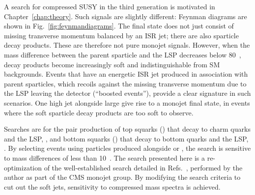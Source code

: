 A search for compressed \ac{SUSY} in the third generation is motivated in Chapter~\ref{chap:theory}.
Such signals are slightly different: Feynman diagrams are shown in Fig.~\ref{fig:feynmandiagrams}. 
The final state does not just consist of missing transverse momentum balanced by an ISR jet; 
there are also sparticle decay products.
These are therefore not pure monojet signals.
However, when the mass difference between the parent sparticle and the \ac{LSP} decreases below 80~\GeV, decay products become increasingly soft
and indistinguishable from \ac{SM} backgrounds.
Events that have an energetic \ac{ISR} jet produced in association with parent sparticles, which recoils against the missing transverse momentum due to the LSP leaving the detector (``boosted events''),
provide a clear signature in such scenarios.
One high \pt jet alongside large \MET give rise to a monojet final state, in events where the soft sparticle decay products are too soft to observe.


Searches are for the pair production of top squarks (\sTop\santiTop) that decay to charm quarks and the LSP, \ttwocc, and bottom squarks (\sBot\santiBot) that decay to bottom quarks and the LSP, \ttwobb.
By selecting events using particles produced alongside \sTop\santiTop or \sBot\santiBot, the search is sensitive to mass differences of less than 10~\GeV.
The search presented here is a re-optimization of the well-established search detailed in Refs.~\cite{bib:CMSEXO12048,bib:CMS_EXO11003,bib:CMSEXO11059}, performed by the author as part of the CMS monojet group.
By modifying the search criteria to cut out the soft jets, sensitivity to compressed mass spectra is achieved.


